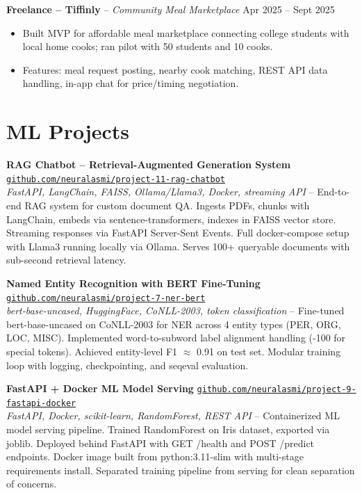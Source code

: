 \documentclass[11pt,a4paper]{article}
\newcommand{\github}[1]{\href{https://github.com/#1}{\texttt{github.com/#1}}}
\begin{document}
\textbf{Freelance -- Tiffinly} -- \textit{Community Meal Marketplace} \hfill Apr 2025 -- Sept 2025
\begin{itemize}
  \item Built MVP for affordable meal marketplace connecting college students with
        local home cooks; ran pilot with 50 students and 10 cooks.
  \item Features: meal request posting, nearby cook matching, REST API data
        handling, in-app chat for price/timing negotiation.
\end{itemize}

\section*{ML Projects}

\noindent\textbf{RAG Chatbot -- Retrieval-Augmented Generation System}
\hfill \github{neuralasmi/project-11-rag-chatbot} \\
\textit{FastAPI, LangChain, FAISS, Ollama/Llama3, Docker, streaming API} --
End-to-end RAG system for custom document QA. Ingests PDFs, chunks with
LangChain, embeds via sentence-transformers, indexes in FAISS vector store.
Streaming responses via FastAPI Server-Sent Events. Full docker-compose setup
with Llama3 running locally via Ollama. Serves 100+ queryable documents with
sub-second retrieval latency.

\noindent\textbf{Named Entity Recognition with BERT Fine-Tuning}
\hfill \github{neuralasmi/project-7-ner-bert} \\
\textit{bert-base-uncased, HuggingFace, CoNLL-2003, token classification} --
Fine-tuned bert-base-uncased on CoNLL-2003 for NER across 4 entity types
(PER, ORG, LOC, MISC). Implemented word-to-subword label alignment handling
(-100 for special tokens). Achieved entity-level F1 $\approx$ 0.91 on test set.
Modular training loop with logging, checkpointing, and seqeval evaluation.

\noindent\textbf{FastAPI + Docker ML Model Serving}
\hfill \github{neuralasmi/project-9-fastapi-docker} \\
\textit{FastAPI, Docker, scikit-learn, RandomForest, REST API} --
Containerized ML model serving pipeline. Trained RandomForest on Iris dataset,
exported via joblib. Deployed behind FastAPI with GET /health and POST /predict
endpoints. Docker image built from python:3.11-slim with multi-stage requirements
install. Separated training pipeline from serving for clean separation of concerns.
\end{document}

